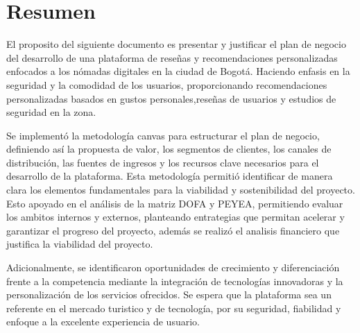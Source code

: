 \section{Resumen}
\noindent
El proposito del siguiente documento es presentar y justificar el plan de negocio del desarrollo de una plataforma de reseñas y recomendaciones personalizadas enfocados a los nómadas digitales en la ciudad de Bogotá. Haciendo enfasis en la seguridad y la comodidad de los usuarios, proporcionando recomendaciones personalizadas basados en gustos personales,reseñas de usuarios y estudios de seguridad en la zona.

Se implementó la metodología canvas para estructurar el plan de negocio, definiendo así la propuesta de valor, los segmentos de clientes, los canales de distribución, las fuentes de ingresos y los recursos clave necesarios para el desarrollo de la plataforma. Esta metodología permitió identificar de manera clara los elementos fundamentales para la viabilidad y sostenibilidad del proyecto.
Esto apoyado en el análisis de la matriz DOFA y PEYEA, permitiendo evaluar los ambitos internos y externos, planteando entrategias que permitan acelerar y garantizar el progreso del proyecto, además se realizó el analisis financiero que justifica la viabilidad del proyecto.

Adicionalmente, se identificaron oportunidades de crecimiento y diferenciación frente a la competencia mediante la integración de tecnologías innovadoras y la personalización de los servicios ofrecidos. Se espera que la plataforma sea un referente en el mercado turistico y de tecnología, por su seguridad, fiabilidad y enfoque a la excelente experiencia de usuario.